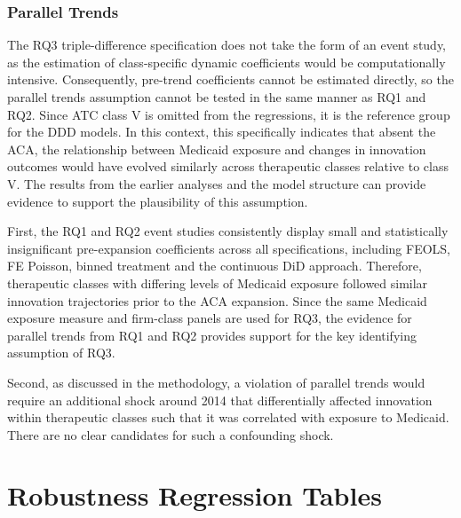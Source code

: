 \documentclass[12pt]{article}
\begin{document}
\subsubsection{Parallel Trends}

The RQ3 triple-difference specification does not take the form of an event study, as the estimation of class-specific dynamic coefficients would be computationally intensive. Consequently, pre-trend coefficients cannot be estimated directly, so the parallel trends assumption cannot be tested in the same manner as RQ1 and RQ2. Since ATC class V is omitted from the regressions, it is the reference group for the DDD models. In this context, this specifically indicates that absent the ACA, the relationship between Medicaid exposure and changes in innovation outcomes would have evolved similarly across therapeutic classes relative to class V. The results from the earlier analyses and the model structure can provide evidence to support the plausibility of this assumption.

First, the RQ1 and RQ2 event studies consistently display small and statistically insignificant pre-expansion coefficients across all specifications, including FEOLS, FE Poisson, binned treatment and the continuous DiD approach. Therefore, therapeutic classes with differing levels of Medicaid exposure followed similar innovation trajectories prior to the ACA expansion. Since the same Medicaid exposure measure and firm-class panels are used for RQ3, the evidence for parallel trends from RQ1 and RQ2 provides support for the key identifying assumption of RQ3.

Second, as discussed in the methodology, a violation of parallel trends would require an additional shock around 2014 that differentially affected innovation within therapeutic classes such that it was correlated with exposure to Medicaid. There are no clear candidates for such a confounding shock.

\clearpage




\ifdefined\isdraft\else

\clearpage
\appendix

\section{Robustness Regression Tables}
\end{document}
